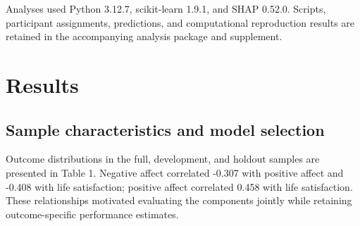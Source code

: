 \documentclass[11pt,letterpaper]{article}
\begin{document}
Analyses used Python 3.12.7, scikit-learn 1.9.1, and SHAP 0.52.0. Scripts, participant assignments, predictions, and computational reproduction results are retained in the accompanying analysis package and supplement.

\FloatBarrier

\section{Results}\label{results}

\subsection{Sample characteristics and model selection}\label{sample-characteristics-and-model-selection}

Outcome distributions in the full, development, and holdout samples are presented in Table 1. Negative affect correlated \mbox{-0.307} with positive affect and \mbox{-0.408} with life satisfaction; positive affect correlated 0.458 with life satisfaction. These relationships motivated evaluating the components jointly while retaining outcome-specific performance estimates.
\end{document}
